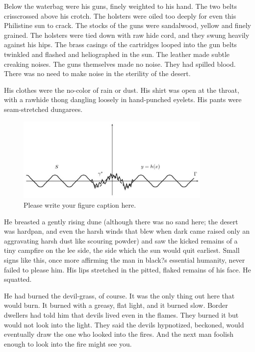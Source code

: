 \documentclass[
11pt,%
tightenlines,%
twoside,%
onecolumn,%
nofloats,%
nobibnotes,%
nofootinbib,%
superscriptaddress,%
noshowpacs,%
centertags]%
{revtex4}
\begin{document}
Below the waterbag were his guns, finely weighted to his hand. The two belts crisscrossed above his crotch. The holsters were oiled too deeply for even this Philistine sun to crack. The stocks of the guns were sandalwood, yellow and finely grained. The holsters were tied down with raw hide cord, and they swung heavily against his hips. The brass casings of the cartridges looped into the gun belts twinkled and flashed and heliographed in the sun. The leather made subtle creaking noises. The guns themselves made no noise. They had spilled blood. There was no need to make noise in the sterility of the desert.

His clothes were the no-color of rain or dust. His shirt was open at the throat, with a rawhide thong dangling loosely in hand-punched eyelets. His pants were seam-stretched dungarees.

\begin{figure}[h]
\setcaptionmargin{5mm}
\onelinecaptionstrue  %
\includegraphics[width=0.85\textwidth]{deform.eps}
\caption{Please write your figure caption here.}\label{fig:1}
\end{figure}

He breasted a gently rising dune (although there was no sand here; the desert was hardpan, and even the harsh winds that blew when dark came raised only an aggravating harsh dust like scouring powder) and saw the kicked remains of a tiny campfire on the lee side, the side which the sun would quit earliest. Small signs like this, once more affirming the man in black?s essential humanity, never failed to please him. His lips stretched in the pitted, flaked remains of his face. He squatted.

He had burned the devil-grass, of course. It was the only thing out here that would burn. It burned with a greasy, flat light, and it burned slow. Border dwellers had told him that devils lived even in the flames. They burned it but would not look into the light. They said the devils hypnotized, beckoned, would eventually draw the one who looked into the fires. And the next man foolish enough to look into the fire might see you.
\end{document}
